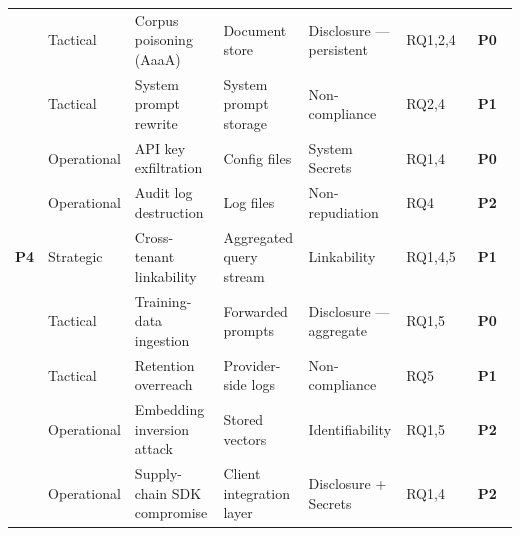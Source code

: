 \documentclass[12pt, a4paper]{report}
\newcommand{\prioHigh}{\colorbox{prioP0}{\color{white}\small\textbf{~\textsf{P0}~}}}
\newcommand{\prioMed}{\colorbox{prioP1}{\color{white}\small\textbf{~\textsf{P1}~}}}
\newcommand{\prioLow}{\colorbox{prioP2}{\color{white}\small\textbf{~\textsf{P2}~}}}
\begin{document}
\begin{longtable}{
    L{1.7cm}
    L{1.3cm}
    L{2.3cm}
    L{3.2cm}
    L{2.2cm}
    C{0.9cm}
    C{0.9cm}
  }
  \small
    & \small Tactical
    & \small Corpus poisoning (AaaA)
    & \small Document store
    & \small Disclosure --- persistent
    & \small RQ1,2,4
    & \small \prioHigh \\

  \small
    & \small Tactical
    & \small System prompt rewrite
    & \small System prompt storage
    & \small Non-compliance
    & \small RQ2,4
    & \small \prioMed \\

  \small
    & \small Operational
    & \small API key exfiltration
    & \small Config files
    & \small System Secrets
    & \small RQ1,4
    & \small \prioHigh \\

  \small
    & \small Operational
    & \small Audit log destruction
    & \small Log files
    & \small Non-repudiation
    & \small RQ4
    & \small \prioLow \\

  \midrule

  \small\textbf{P4}
    & \small Strategic
    & \small Cross-tenant linkability
    & \small Aggregated query stream
    & \small Linkability
    & \small RQ1,4,5
    & \small \prioMed \\

  \small
    & \small Tactical
    & \small Training-data ingestion
    & \small Forwarded prompts
    & \small Disclosure --- aggregate
    & \small RQ1,5
    & \small \prioHigh \\

  \small
    & \small Tactical
    & \small Retention overreach
    & \small Provider-side logs
    & \small Non-compliance
    & \small RQ5
    & \small \prioMed \\

  \small
    & \small Operational
    & \small Embedding inversion attack
    & \small Stored vectors
    & \small Identifiability
    & \small RQ1,5
    & \small \prioLow \\

  \small
    & \small Operational
    & \small Supply-chain SDK compromise
    & \small Client integration layer
    & \small Disclosure + Secrets
    & \small RQ1,4
    & \small \prioLow \\

  \bottomrule
\end{longtable}
\end{document}
